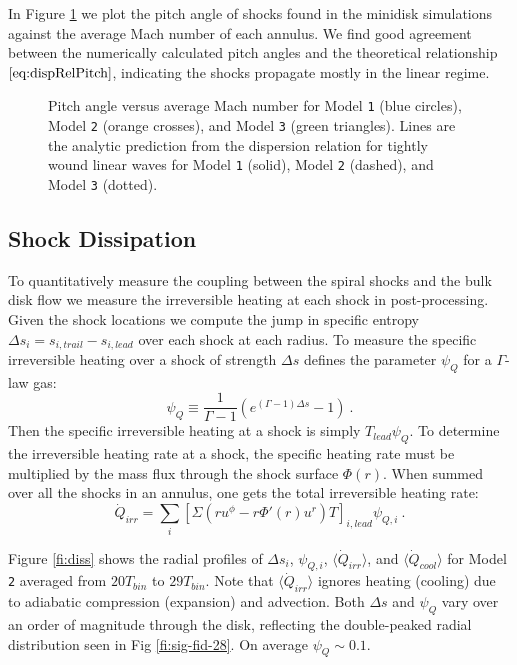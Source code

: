 \documentclass{emulateapj}
\newcommand{\Gam}{\Gamma}
\newcommand{\De}{\Delta}
\newcommand{\model}[1]{{Model \texttt{#1}}}
\newcommand{\avet}[1]{ \langle #1 \rangle}
\begin{document}
In Figure \ref{fi:disp} we plot the pitch angle of shocks found in the minidisk simulations against the average Mach number of each annulus. We find good agreement between the numerically calculated pitch angles and the theoretical relationship $\eqref{eq:dispRelPitch}$, indicating the shocks propagate mostly in the linear regime.

\begin{figure}
\caption{\label{fi:disp} Pitch angle versus average Mach number for \model{1} (blue circles), \model{2} (orange crosses), and \model{3} (green triangles). Lines are the analytic prediction from the dispersion relation for tightly wound linear waves for \model{1} (solid), \model{2} (dashed), and \model{3} (dotted).}
\end{figure}



\subsection{Shock Dissipation}
\label{subsec:diss}

To quantitatively measure the coupling between the spiral shocks and the bulk disk flow we measure the irreversible heating at each shock in post-processing.  Given the shock locations we compute the jump in specific entropy $\Delta s_i = s_{i,trail} - s_{i,lead}$ over each shock at each radius.  To measure the specific irreversible heating over a shock of strength $\De s$ \cite{Rafikov16} defines the parameter $\psi_Q$ for a $\Gam$-law gas:
\begin{equation}
	\psi_Q \equiv \frac{1}{\Gam - 1} \left( e^{(\Gam -1)\De s } - 1 \right) \ . \label{eq:def-psi}
\end{equation}
Then the specific irreversible heating at a shock is simply $T_{lead} \psi_Q$.  To determine the irreversible heating rate at a shock, the specific heating rate must be multiplied by the mass flux through the shock surface $\Phi(r)$.  When summed over all the shocks in an annulus, one gets the total irreversible heating rate:
\begin{equation}
	\dot{Q}_{irr} = \sum_i \left[ \Sigma \left(r u^\phi - r \Phi'(r) u^r \right) T \right]_{i,lead} \psi_{Q,i} \ . \label{eq:QirrRaf}
\end{equation}

Figure \ref{fi:diss} shows the radial profiles of $\Delta s_i$, $\psi_{Q,i}$, $\avet{\dot{Q}_{irr}}$, and $\avet{\dot{Q}_{cool}}$ for \model{2} averaged from $20 T_{bin}$ to $29 T_{bin}$.  Note that $\avet{\dot{Q}_{irr}}$ ignores heating (cooling) due to adiabatic compression (expansion) and advection.  Both $\De s$ and $\psi_Q$ vary over an order of magnitude through the disk, reflecting the double-peaked radial distribution seen in Fig \ref{fi:sig-fid-28}. On average $\psi_Q \sim 0.1$.  
\end{document}
